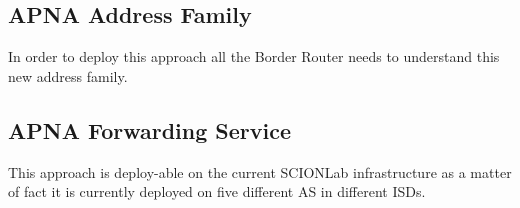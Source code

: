 \subsection{APNA Address Family}
In order to deploy this approach all the Border Router needs to understand this new address family.

\subsection{APNA Forwarding Service}
This approach is deploy-able on the current SCIONLab infrastructure as a matter of fact it is currently deployed on five different AS in different ISDs.